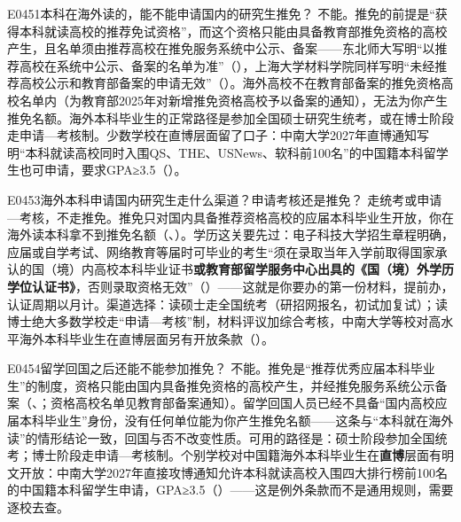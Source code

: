 \begin{qa}{E0451}{本科在海外读的，能不能申请国内的研究生推免？}
不能。推免的前提是“获得本科就读高校的推荐免试资格”，而这个资格只能由具备教育部推免资格的高校产生，且名单须由推荐高校在推免服务系统中公示、备案——东北师大写明“以推荐高校在系统中公示、备案的名单为准”（），上海大学材料学院同样写明“未经推荐高校公示和教育部备案的申请无效”（）。海外高校不在教育部备案的推免资格高校名单内（为教育部2025年对新增推免资格高校予以备案的通知），无法为你产生推免名额。海外本科毕业生的正常路径是参加全国硕士研究生统考，或在博士阶段走申请—考核制。少数学校在直博层面留了口子：中南大学2027年直博通知写明“本科就读高校同时入围QS、THE、USNews、软科前100名”的中国籍本科留学生也可申请，要求GPA≥3.5（）。
\end{qa}

\begin{qa}{E0453}{海外本科申请国内研究生走什么渠道？申请考核还是推免？}
走统考或申请—考核，不走推免。推免只对国内具备推荐资格高校的应届本科毕业生开放，你在海外读本科拿不到推免名额（、）。学历这关要先过：电子科技大学招生章程明确，应届或自学考试、网络教育等届时可毕业的考生“须在录取当年入学前取得国家承认的国（境）内高校本科毕业证书\textbf{或教育部留学服务中心出具的《国（境）外学历学位认证书》}，否则录取资格无效”（）——这就是你要办的第一份材料，提前办，认证周期以月计。渠道选择：读硕士走全国统考（研招网报名，初试加复试）；读博士绝大多数学校走“申请—考核”制，材料评议加综合考核，中南大学等校对高水平海外本科毕业生在直博层面另有开放条款（）。
\end{qa}

\begin{qa}{E0454}{留学回国之后还能不能参加推免？}
不能。推免是“推荐优秀应届本科毕业生”的制度，资格只能由国内具备推免资格的高校产生，并经推免服务系统公示备案（、；资格高校名单见教育部备案通知）。留学回国人员已经不具备“国内高校应届本科毕业生”身份，没有任何单位能为你产生推免名额——这条与“本科就在海外读”的情形结论一致，回国与否不改变性质。可用的路径是：硕士阶段参加全国统考；博士阶段走申请—考核制。个别学校对中国籍海外本科毕业生在\textbf{直博}层面有明文开放：中南大学2027年直接攻博通知允许本科就读高校入围四大排行榜前100名的中国籍本科留学生申请，GPA≥3.5（）——这是例外条款而不是通用规则，需要逐校去查。
\end{qa}

